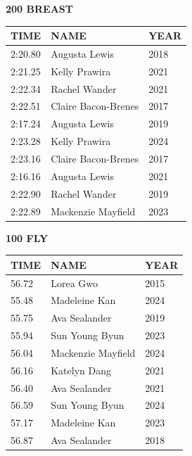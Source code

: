 \begin{table}[H]
\centering
\begin{minipage}[t]{0.48\textwidth}
\centering
\textbf{200 BREAST}\\[0.1cm]
\begin{tabular}{@{}p{1.8cm}p{2.8cm}p{1.2cm}@{}}
\hline
    \textbf{TIME} & \textbf{NAME} & \textbf{YEAR} \\
\hline
    2:20.80 & Augusta Lewis & 2018 \\
    2:21.25 & Kelly Prawira & 2021 \\
    2:22.34 & Rachel Wander & 2021 \\
    2:22.51 & Claire Bacon-Brenes & 2017 \\
    2:17.24 & Augusta Lewis & 2019 \\
    2:23.28 & Kelly Prawira & 2024 \\
    2:23.16 & Claire Bacon-Brenes & 2017 \\
    2:16.16 & Augusta Lewis & 2021 \\
    2:22.90 & Rachel Wander & 2019 \\
    2:22.89 & Mackenzie Mayfield & 2023 \\
\hline
\end{tabular}
\end{minipage}\hfill
\begin{minipage}[t]{0.48\textwidth}
\centering
\textbf{100 FLY}\\[0.1cm]
\begin{tabular}{@{}p{1.8cm}p{2.8cm}p{1.2cm}@{}}
\hline
    \textbf{TIME} & \textbf{NAME} & \textbf{YEAR} \\
\hline
    56.72 & Lorea Gwo & 2015 \\
    55.48 & Madeleine Kan & 2024 \\
    55.75 & Ava Sealander & 2019 \\
    55.94 & Sun Young Byun & 2023 \\
    56.04 & Mackenzie Mayfield & 2024 \\
    56.16 & Katelyn Dang & 2021 \\
    56.40 & Ava Sealander & 2021 \\
    56.59 & Sun Young Byun & 2024 \\
    57.17 & Madeleine Kan & 2023 \\
    56.87 & Ava Sealander & 2018 \\
\hline
\end{tabular}
\end{minipage}
\end{table}

